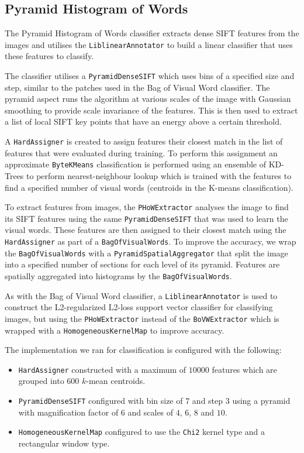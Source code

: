 \documentclass[paper=a4]{article}
\begin{document}
\subsection{Pyramid Histogram of Words}

The Pyramid Histogram of Words classifier extracts dense SIFT features from the images and utilises the \texttt{LiblinearAnnotator} to build a linear classifier that uses these features to classify.

The classifier utilises a \texttt{PyramidDenseSIFT} which uses bins of a specified size and step, similar to the patches used in the Bag of Visual Word classifier. The pyramid aspect runs the algorithm at various scales of the image with Gaussian smoothing to provide scale invariance of the features. This is then used to extract a list of local SIFT key points that have an energy above a certain threshold.

A \texttt{HardAssigner} is created to assign features their closest match in the list of features that were evaluated during training. To perform this assignment an approximate \texttt{ByteKMeans} classification is performed using an ensemble of KD-Trees to perform nearest-neighbour lookup which is trained with the features to find a specified number of visual words (centroids in the K-means classification).

To extract features from images, the \texttt{PHoWExtractor} analyses the image to find its SIFT features using the same \texttt{PyramidDenseSIFT} that was used to learn the visual words. These features are then assigned to their closest match using the \texttt{HardAssigner} as part of a \texttt{BagOfVisualWords}. To improve the accuracy, we wrap the \texttt{BagOfVisualWords} with a \texttt{PyramidSpatialAggregator} that split the image into a specified number of sections for each level of its pyramid. Features are spatially aggregated into histograms by the \texttt{BagOfVisualWords}.


As with the Bag of Visual Word classifier, a \texttt{LiblinearAnnotator} is used to construct the L2-regularized L2-loss support vector classifier for classifying images, but using the \texttt{PHoWExtractor} instead of the \texttt{BoVWExtractor} which is wrapped with a \texttt{HomogeneousKernelMap} to improve accuracy.

The implementation we ran for classification is configured with the following:
\begin{itemize}
\item \texttt{HardAssigner} constructed with a maximum of $10000$ features which are grouped into $600$ $k$-mean centroids.
\item \texttt{PyramidDenseSIFT} configured with bin size of $7$ and step $3$ using a pyramid with magnification factor of $6$ and scales of $4$, $6$, $8$ and $10$.
\item \texttt{HomogeneousKernelMap} configured to use the \texttt{Chi2} kernel type and a rectangular window type.
\end{itemize}
\end{document}
